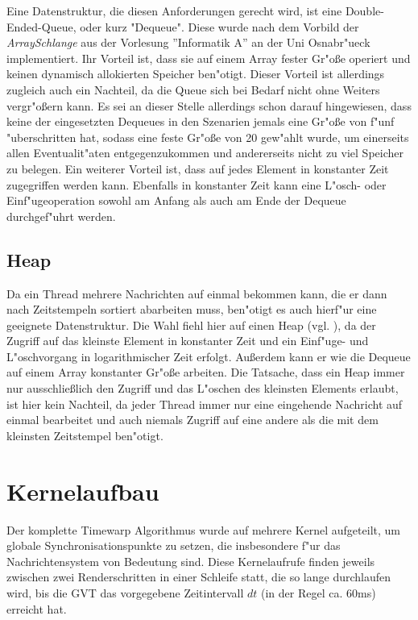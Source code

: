\documentclass[a4paper, 10pt, openright, parskip, chapterprefix]{scrreprt}
\begin{document}
Eine Datenstruktur, die diesen Anforderungen gerecht wird, ist eine Double-Ended-Queue, oder kurz "Dequeue". Diese wurde
nach dem Vorbild der \emph{ArraySchlange} aus der Vorlesung ''Informatik A'' \cite{...} an der Uni Osnabr"ueck
implementiert. Ihr Vorteil ist, dass sie auf einem Array fester Gr"o\ss e operiert und keinen dynamisch allokierten
Speicher ben"otigt. Dieser Vorteil ist allerdings zugleich auch ein Nachteil, da die Queue sich bei Bedarf nicht ohne
Weiters vergr"o\ss ern kann. Es sei an dieser Stelle allerdings schon darauf hingewiesen, dass keine der eingesetzten
Dequeues in den Szenarien jemals eine Gr"o\ss e von f"unf "uberschritten hat, sodass eine feste Gr"o\ss e von 20
gew"ahlt wurde, um einerseits allen Eventualit"aten entgegenzukommen und andererseits nicht zu viel Speicher zu belegen.
Ein weiterer Vorteil ist, dass auf jedes Element in konstanter Zeit zugegriffen werden kann. Ebenfalls in konstanter
Zeit kann eine L"osch- oder Einf"ugeoperation sowohl am Anfang als auch am Ende der Dequeue durchgef"uhrt werden.

\subsection{Heap}
Da ein Thread mehrere Nachrichten auf einmal bekommen kann, die er dann nach Zeitstempeln sortiert abarbeiten muss,
ben"otigt es auch hierf"ur eine geeignete Datenstruktur. Die Wahl fiehl hier auf einen Heap (vgl. \cite{...}), da der
Zugriff auf das kleinste Element in konstanter Zeit und ein Einf"uge- und L"oschvorgang in logarithmischer Zeit erfolgt.
Au\ss erdem kann er wie die Dequeue auf einem Array konstanter Gr"o\ss e arbeiten.
Die Tatsache, dass ein Heap immer nur ausschlie\ss lich den Zugriff und das L"oschen des kleinsten Elements erlaubt, ist
hier kein Nachteil, da jeder Thread immer nur eine eingehende Nachricht auf einmal bearbeitet und auch niemals Zugriff auf eine
andere als die mit dem kleinsten Zeitstempel ben"otigt.

\section{Kernelaufbau}
\label{sec:Kernelaufbau}
Der komplette Timewarp Algorithmus wurde auf mehrere Kernel aufgeteilt, um globale Synchronisationspunkte zu setzen, die
insbesondere f"ur das Nachrichtensystem von Bedeutung sind. 
Diese Kernelaufrufe finden jeweils zwischen zwei Renderschritten in einer Schleife statt, die so lange durchlaufen wird,
bis die GVT das vorgegebene Zeitintervall $dt$ (in der Regel ca. 60ms) erreicht hat.
\end{document}
